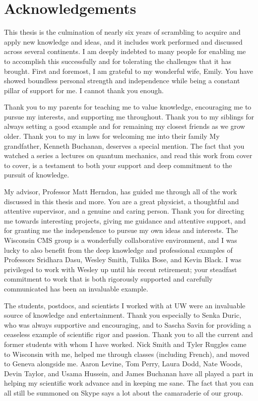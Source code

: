 \section{Acknowledgements}

This thesis is the culmination of nearly six years 
of scrambling to acquire and apply new knowledge and ideas,
and it includes work performed and discussed across several continents. 
I am deeply indebted to many people for enabling me to accomplish this
successfully and for tolerating the challenges that it has brought.
First and foremost, I am grateful
to my wonderful wife, Emily. You have showed boundless
personal strength and independence while being a constant pillar of 
support for me. I cannot thank you enough.

Thank you to my parents for teaching me to value knowledge,
encouraging me to pursue my interests, and supporting me throughout. Thank
you to my siblings for always setting a good example and for remaining 
my closest friends as we grow older.
Thank you to my in laws for welcoming me into their family 
My grandfather, Kenneth Buchanan, deserves a special mention. 
The fact that you watched a series a lectures on quantum mechanics, 
and read this work from cover to cover, is a testament to both your support
and deep commitment to the pursuit of knowledge.

My advisor, Professor Matt Herndon, has guided me through all of the work discussed
in this thesis and more.
You are a great physicist, a thoughtful and attentive supervisor,
and a genuine and caring person. Thank you for directing me towards interesting
projects, giving me guidance and attentive support, and for 
granting me the independence to pursue my own ideas and interests.
The Wisconsin CMS group is a wonderfully collaborative environment,
and I was lucky to also benefit from the deep knowledge and professional examples
of Professors Sridhara Dasu, Wesley Smith, Tulika Bose, and Kevin Black. 
I was privileged to work with Wesley up until his recent retirement;
your steadfast commitment to work that is both rigorously
supported and carefully communicated has been an invaluable example.

The students, postdocs, and scientists I worked with at UW were an invaluable 
source of knowledge and entertainment. 
Thank you especially to Senka Duric, who was always supportive and
encouraging, and to 
Sascha Savin for providing a ceaseless example of scientific
rigor and passion.  
Thank you to all the current and former students with whom I have worked.
Nick Smith and Tyler Ruggles came to Wisconsin with me, 
helped me through classes (including French), and moved to Geneva
alongside me. Aaron Levine, Tom Perry, Laura Dodd, Nate Woods, Devin Taylor,
and Usama Hussein, and James Buchanan have all played a part in helping my
scientific work advance and in keeping me sane. The fact that you can all
still be summoned on Skype says a lot about the camaraderie of our group.

